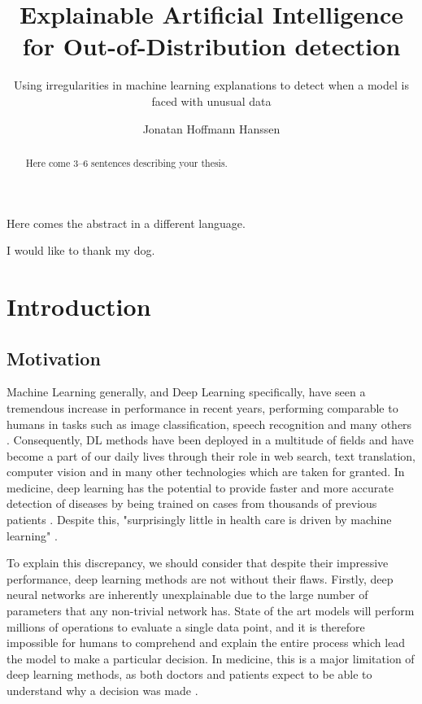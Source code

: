 \documentclass[UKenglish]{uiomasterthesis} %
\title{Explainable Artificial Intelligence for Out-of-Distribution detection}
\subtitle{Using irregularities in machine learning explanations to detect when a model is faced with unusual data}
\author{Jonatan Hoffmann Hanssen}
\theoremstyle{definition}
\begin{document}
\uiomasterfp[dept={Department of Informatics},
program={Robotics and Intelligent Systems},
supervisors={Hugo Lewi Hammer \and Kyrre Harald Glette},
long]

\frontmatter{}
\begin{abstract}
Here come 3--6 sentences describing your thesis.
\end{abstract}

\begin{xabstract}[Sammendrag]
Here comes the abstract in a different language.
\end{xabstract}

\tableofcontents{}
\listoffigures{}
\listoftables{}

\begin{preface}
I would like to thank my dog.
\end{preface}

\mainmatter{}
\chapter{Introduction}

\section{Motivation}

Machine Learning generally, and Deep Learning specifically, have seen a tremendous increase in performance in recent years, performing comparable to humans in tasks such as image classification, speech recognition and many others \cite{performance}. Consequently, DL methods have been deployed in a multitude of fields and have become a part of our daily lives through their role in web search, text translation, computer vision and in many other technologies which are taken for granted. In medicine, deep learning has the potential to provide faster and more accurate detection of diseases by being trained on cases from thousands of previous patients \cite{xaisurvey}. Despite this, "surprisingly little in health care is driven by machine learning" \cite{dlmed}.


To explain this discrepancy, we should consider that despite their impressive performance, deep learning methods are not without their flaws. Firstly, deep neural networks are inherently unexplainable due to the large number of parameters that any non-trivial network has. State of the art models will perform millions of operations to evaluate a single data point, and it is therefore impossible for humans to comprehend and explain the entire process which lead the model to make a particular decision. In medicine, this is a major limitation of deep learning methods, as both doctors and patients expect to be able to understand why a decision was made \cite{tingsim}.
\end{document}
